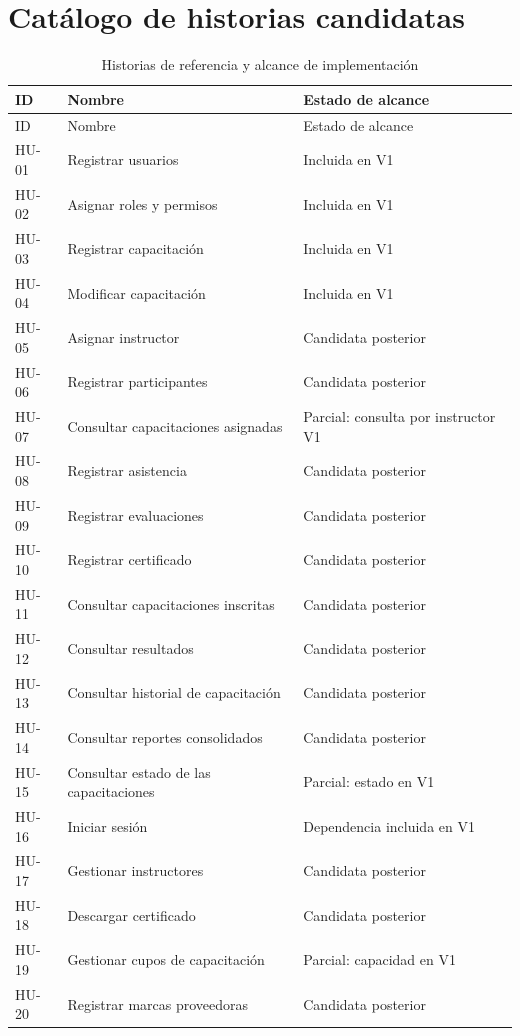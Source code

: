 \section{Catálogo de historias candidatas}
\begin{longtable}{P{1.5cm}P{8.1cm}P{3.1cm}}
\caption{Historias de referencia y alcance de implementación}\label{tab:historias}\\
\toprule ID & Nombre & Estado de alcance \\ \midrule
\endfirsthead
\toprule ID & Nombre & Estado de alcance \\ \midrule
\endhead
HU-01 & Registrar usuarios & Incluida en V1 \\
HU-02 & Asignar roles y permisos & Incluida en V1 \\
HU-03 & Registrar capacitación & Incluida en V1 \\
HU-04 & Modificar capacitación & Incluida en V1 \\
HU-05 & Asignar instructor & Candidata posterior \\
HU-06 & Registrar participantes & Candidata posterior \\
HU-07 & Consultar capacitaciones asignadas & Parcial: consulta por instructor V1 \\
HU-08 & Registrar asistencia & Candidata posterior \\
HU-09 & Registrar evaluaciones & Candidata posterior \\
HU-10 & Registrar certificado & Candidata posterior \\
HU-11 & Consultar capacitaciones inscritas & Candidata posterior \\
HU-12 & Consultar resultados & Candidata posterior \\
HU-13 & Consultar historial de capacitación & Candidata posterior \\
HU-14 & Consultar reportes consolidados & Candidata posterior \\
HU-15 & Consultar estado de las capacitaciones & Parcial: estado en V1 \\
HU-16 & Iniciar sesión & Dependencia incluida en V1 \\
HU-17 & Gestionar instructores & Candidata posterior \\
HU-18 & Descargar certificado & Candidata posterior \\
HU-19 & Gestionar cupos de capacitación & Parcial: capacidad en V1 \\
HU-20 & Registrar marcas proveedoras & Candidata posterior \\

\end{longtable}
